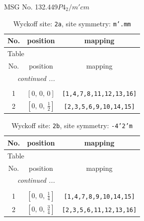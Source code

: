 \documentclass[fleqn,8pt]{jsarticle}
\begin{document}
\setcounter{MaxMatrixCols}{32}

\renewcommand{\tablename}{Table~}
\renewcommand{\figurename}{Figure~}
\begin{center}
\LARGE
MSG No. 132.449\quad$P4_{2}/m'cm$
\end{center}
\renewcommand{\arraystretch}{1.2}
\begin{longtable}{ccc}
\caption{Wyckoff site: {\tt 2a}, site symmetry: {\tt m'.mm}}
 \\
 \hline \hline
No. & position & mapping \\ \hline \endfirsthead

\multicolumn{2}{l}{\tablename\ \thetable{}} \\
 \hline \hline
No. & position & mapping \\ \hline \endhead

 \hline \hline
\multicolumn{2}{r}{\footnotesize\it continued ...} \\ \endfoot

 \hline \hline
\multicolumn{2}{r}{} \\ \endlastfoot

1 & $\left[ 0,\, 0,\, 0 \right]$ & {\tt [1,4,7,8,11,12,13,16]} \\ \hline
2 & $\left[ 0,\, 0,\, \frac{1}{2} \right]$ & {\tt [2,3,5,6,9,10,14,15]} \\
\end{longtable}
\renewcommand{\arraystretch}{1.2}
\begin{longtable}{ccc}
\caption{Wyckoff site: {\tt 2b}, site symmetry: {\tt -4'2'm}}
 \\
 \hline \hline
No. & position & mapping \\ \hline \endfirsthead

\multicolumn{2}{l}{\tablename\ \thetable{}} \\
 \hline \hline
No. & position & mapping \\ \hline \endhead

 \hline \hline
\multicolumn{2}{r}{\footnotesize\it continued ...} \\ \endfoot

 \hline \hline
\multicolumn{2}{r}{} \\ \endlastfoot

1 & $\left[ 0,\, 0,\, \frac{1}{4} \right]$ & {\tt [1,4,7,8,9,10,14,15]} \\ \hline
2 & $\left[ 0,\, 0,\, \frac{3}{4} \right]$ & {\tt [2,3,5,6,11,12,13,16]} \\
\end{longtable}
\end{document}
